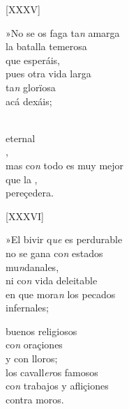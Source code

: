 \documentclass[11pt,a4paper,twoside]{article}
\begin{document}
\begin{center}
	[XXXV]
\end{center}
\pstart
»No se os faga ta\textit{n} amarga\\
la batalla temerosa\\
que esperáis,\\
pues otra vida  larga\\
 ta\textit{n} glorïosa\\ 
acá dexáis;\par
{}\\
 eternal\\
 ,\\
mas co\textit{n} todo es muy mejor\\
que la  ,\\     
pereçedera.\par
\pend

\begin{center}
	[XXXVI]
\end{center}
\pstart
»El bivir q\textit{ue} es perdurable\\
no se gana co\textit{n} estados\\ 
mu\textit{n}danales,\\
ni co\textit{n} vida deleitable\\
en que mora\textit{n} los pecados\\
infernales;\par
{} buenos religiosos\\
 co\textit{n} oraçiones\\                                           
y con lloros;\\
los cavall\textit{er}os famosos\\
co\textit{n} trabajos y afliçiones\\ 
contra moros.\par
\pend
\end{document}
